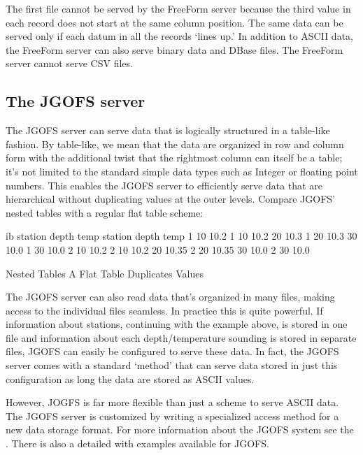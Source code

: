 \documentclass{dods-paper}
\begin{document}
The first file cannot be served by the FreeForm server because the
third value in each record does not start at the same column position.
The same data can be served only if each datum in all the records `lines
up.' In addition to ASCII data, the FreeForm server can also serve
binary data and DBase files.  The FreeForm server cannot serve CSV
files.


\subsection{The JGOFS server}

The JGOFS server can serve data that is logically structured in a
table-like fashion. By table-like, we mean that the data are organized
in row and column form with the additional twist that the rightmost
column can itself be a table; it's not limited to the standard simple
data types such as Integer or floating point numbers. This enables the
JGOFS server to efficiently serve data that are hierarchical without
duplicating values at the outer levels.  Compare JGOFS' nested tables
with a regular flat table scheme:
   
\begin{vcode}{ib}
station depth temp                         station depth temp
1       10    10.2                         1       10    10.2
        20    10.3                         1       20    10.3
        30    10.0                         1       30    10.0
2       10    10.2                         2       10    10.2
        20    10.35                        2       20    10.35
        30    10.0                         2       30    10.0
                   
   Nested Tables                      A Flat Table Duplicates Values
\end{vcode}

The JGOFS server can also read data that's organized in many files,
making access to the individual files seamless. In practice this is
quite powerful.  If information about stations, continuing with the
example above, is stored in one file and information about each
depth/temperature sounding is stored in separate files, JGOFS can
easily be configured to serve these data.  In fact, the JGOFS server
comes with a standard `method' that can serve data stored in just this
configuration as long the data are stored as ASCII values.

However, JOGFS is far more flexible than just a scheme to serve ASCII
data.  The JGOFS server is customized by writing a specialized access
method for a new data storage format. For more information about the
JGOFS system see the .  There is also
a detailed  with examples
available for JGOFS.
\end{document}
